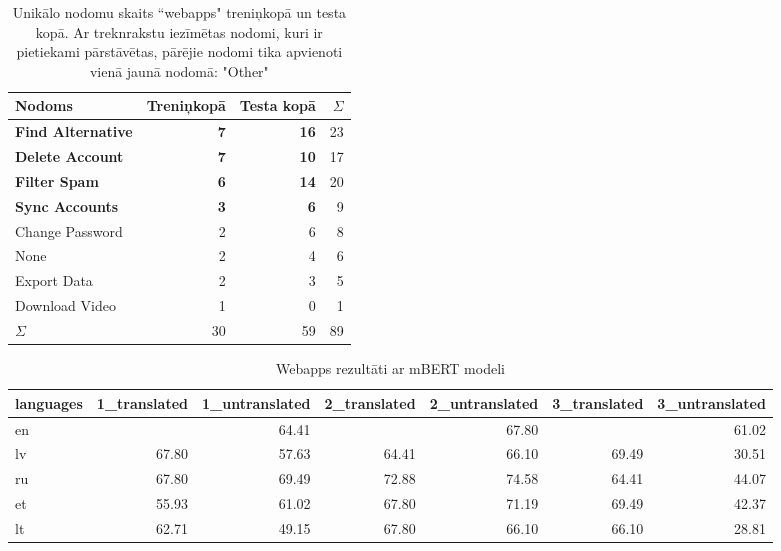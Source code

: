 \begin{table}[htbp]
  \centering
  \caption{Unikālo nodomu skaits ``webapps" treniņkopā un testa kopā. Ar treknrakstu iezīmētas nodomi, kuri ir pietiekami pārstāvētas, pārējie nodomi tika apvienoti vienā jaunā nodomā: "Other"}
    \begin{tabular}{lrrr} \toprule
    Nodoms & Treniņkopā & Testa kopā & $\Sigma$ \\\midrule
    \textbf{Find Alternative} & \textbf{7} & \textbf{16} & 23\\
    \textbf{Delete Account} & \textbf{7} & \textbf{10} & 17\\
    \textbf{Filter Spam} & \textbf{6} & \textbf{14} & 20 \\
    \textbf{Sync Accounts} & \textbf{3} & \textbf{6} & 9 \\
    Change Password & 2     & 6 & 8\\
    None  & 2     & 4 & 6\\
    Export Data & 2     & 3 & 5 \\
    Download Video & 1     & 0 & 1\\
    $\Sigma$ & 30    & 59 & 89 \\\bottomrule
    \end{tabular}%
  \label{tab:webapps-labels}%
\end{table}%


\begin{table}[htbp]
  \centering
  \caption{Webapps rezultāti ar mBERT modeli}
    \begin{tabular}{lrrrrrr}\toprule
    languages & 1\_translated & 1\_untranslated & 2\_translated & 2\_untranslated & 3\_translated & 3\_untranslated \\\midrule
    en    &       & 64.41 &       & 67.80 &       & 61.02 \\
    lv    & 67.80 & 57.63 & 64.41 & 66.10 & 69.49 & 30.51 \\
    ru    & 67.80 & 69.49 & 72.88 & 74.58 & 64.41 & 44.07 \\
    et    & 55.93 & 61.02 & 67.80 & 71.19 & 69.49 & 42.37 \\
    lt    & 62.71 & 49.15 & 67.80 & 66.10 & 66.10 & 28.81 \\\bottomrule
    \end{tabular}%
  \label{tab:webapps-bert}%
\end{table}%


